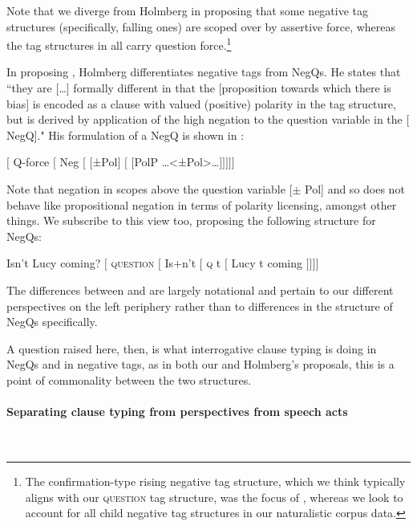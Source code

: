 \documentclass[output=paper,colorlinks,citecolor=brown]{langscibook}
\begin{document}
Note that we diverge from Holmberg in proposing that some negative tag structures (specifically, falling ones) are scoped over by assertive force, whereas the tag structures in \citet{holmberg2016} all carry question force.\footnote{The confirmation-type rising negative tag structure, which we think typically aligns with our \textsc{question} tag structure, was the focus of \citet{holmberg2016}, whereas we look to account for all child negative tag structures in our naturalistic corpus data.}

In proposing , Holmberg differentiates negative tags from NegQs. He states that ``they are $[$\ldots$]$ formally different in that the $[$proposition towards which there is bias$]$ is encoded as a clause with valued (positive) polarity in the tag structure, but is derived by application of the high negation to the question variable in the $[$NegQ$]$." \citep[188]{holmberg2016} His formulation of a NegQ is shown in :

\ea $[$ Q-force $[$ Neg $[$ $[$±Pol$]$ $[$ $[$PolP …<±Pol>…$]]]]]$ \\\phantom{a}  \label{holmbergnegq}
\z

Note that negation in  scopes above the question variable [$\pm$ Pol] and so does not behave like propositional negation in terms of polarity licensing, amongst other things. We subscribe to this view too, proposing the following structure for NegQs:

\ea\label{negq:pass1}
\ea Isn't Lucy coming?
 \ex $[$ \textsc{question} $[$ Is$+$n't $[$ \textsc{q} t $[$ Lucy t coming $]]]]$
\z\z

The differences between  and  are largely notational and pertain to our different perspectives on the left periphery rather than to differences in the structure of NegQs specifically. 

A question raised here, then, is what interrogative clause typing is doing in NegQs and in negative tags, as in both our and Holmberg's proposals, this is a point of commonality between the two structures.

\paragraph{Separating clause typing from perspectives from speech acts}\label{sect:clausetypesnotpersps}\phantom{a}\\
\end{document}
